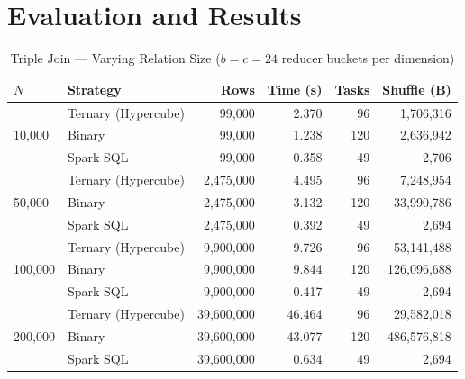 \documentclass[11pt,a4paper]{article}
\begin{document}
\section*{Evaluation and Results}
\begin{table}[htbp]
\centering
\caption{Triple Join — Varying Relation Size ($b = c = 24$ reducer buckets per dimension)}
\label{tab:triple_relation}
\begin{tabular}{llrrrr}
\toprule
\textbf{$N$} & \textbf{Strategy} & \textbf{Rows} & \textbf{Time (s)} & \textbf{Tasks} & \textbf{Shuffle (B)} \\
\midrule
\multirow{3}{*}{10,000}
 & Ternary (Hypercube) & 99,000     & 2.370  & 96  & 1,706,316   \\
 & Binary              & 99,000     & 1.238  & 120 & 2,636,942   \\
 & Spark SQL           & 99,000     & 0.358  & 49  & 2,706       \\
\midrule
\multirow{3}{*}{50,000}
 & Ternary (Hypercube) & 2,475,000  & 4.495  & 96  & 7,248,954   \\
 & Binary              & 2,475,000  & 3.132  & 120 & 33,990,786  \\
 & Spark SQL           & 2,475,000  & 0.392  & 49  & 2,694       \\
\midrule
\multirow{3}{*}{100,000}
 & Ternary (Hypercube) & 9,900,000  & 9.726  & 96  & 53,141,488  \\
 & Binary              & 9,900,000  & 9.844  & 120 & 126,096,688 \\
 & Spark SQL           & 9,900,000  & 0.417  & 49  & 2,694       \\
\midrule
\multirow{3}{*}{200,000}
 & Ternary (Hypercube) & 39,600,000 & 46.464 & 96  & 29,582,018  \\
 & Binary              & 39,600,000 & 43.077 & 120 & 486,576,818 \\
 & Spark SQL           & 39,600,000 & 0.634  & 49  & 2,694       \\
\bottomrule
\end{tabular}
\end{table}
\end{document}
